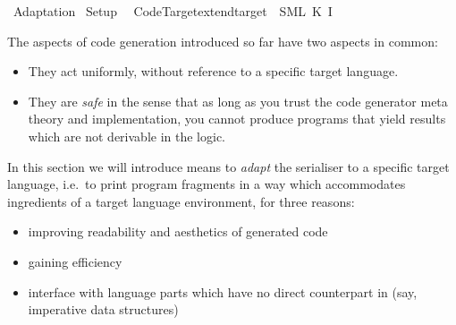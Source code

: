 %
\begin{isabellebody}%
\def\isabellecontext{Adaptation}%
%
\isadelimtheory
%
\endisadelimtheory
%
\isatagtheory
{}\isamarkupfalse%
\ Adaptation\isanewline
{}\ Setup\isanewline
{}%
\endisatagtheory
{\isafoldtheory}%
%
\isadelimtheory
\isanewline
%
\endisadelimtheory
%
\isadeliminvisible
\isanewline
%
\endisadeliminvisible
%
\isataginvisible
{}\isamarkupfalse%
\ {\isacharverbatimopen}\ Code{\isacharunderscore}Target{\isachardot}extend{\isacharunderscore}target\ {\isacharparenleft}{\isachardoublequote}{\isasymSML}{\isachardoublequote}{\isacharcomma}\ {\isacharparenleft}{\isachardoublequote}SML{\isachardoublequote}{\isacharcomma}\ K\ I{\isacharparenright}{\isacharparenright}\ {\isacharverbatimclose}%
\endisataginvisible
{\isafoldinvisible}%
%
\isadeliminvisible
%
\endisadeliminvisible
%
\isamarkuptrue%
%
\isamarkuptrue%
%
\begin{isamarkuptext}%
The aspects of code generation introduced so far have two aspects
  in common:

  \begin{itemize}

    \item They act uniformly, without reference to a specific target
       language.

    \item They are \emph{safe} in the sense that as long as you trust
       the code generator meta theory and implementation, you cannot
       produce programs that yield results which are not derivable in
       the logic.

  \end{itemize}

  \noindent In this section we will introduce means to \emph{adapt}
  the serialiser to a specific target language, i.e.~to print program
  fragments in a way which accommodates 
  ingredients of a target language environment, for three reasons:

  \begin{itemize}
    \item improving readability and aesthetics of generated code
    \item gaining efficiency
    \item interface with language parts which have no direct counterpart
      in  (say, imperative data structures)
  \end{itemize}


\end{isamarkuptext}
\end{isabellebody}
